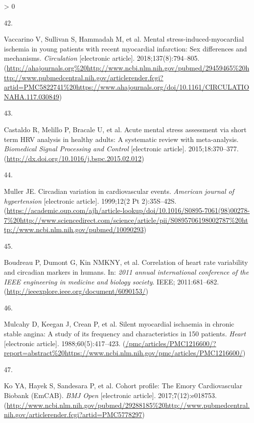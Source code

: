 \documentclass[
  11pt,
  openany]{book}
\newlength{\cslhangindent}
\newlength{\csllabelwidth}
\newenvironment{CSLReferences}[2] %
 {%
  \setlength{\parindent}{0pt}
  \ifodd #1 \everypar{\setlength{\hangindent}{\cslhangindent}}\ignorespaces\fi
  \ifnum #2 > 0
  \setlength{\parskip}{#2\baselineskip}
  \fi
 }%
 {}
\newcommand{\CSLLeftMargin}[1]{\parbox[t]{\csllabelwidth}{#1}}
\newcommand{\CSLRightInline}[1]{\parbox[t]{\linewidth - \csllabelwidth}{#1}\break}
\begin{document}
\begin{CSLReferences}{0}{0}
\leavevmode\hypertarget{ref-Vaccarino2018}{}%
\CSLLeftMargin{42. }
\CSLRightInline{Vaccarino V, Sullivan S, Hammadah M, et al. {Mental stress-induced-myocardial ischemia in young patients with recent myocardial infarction: Sex differences and mechanisms}. \emph{Circulation} {[}electronic article{]}. 2018;137(8):794--805. (\url{http://ahajournals.org\%20http://www.ncbi.nlm.nih.gov/pubmed/29459465\%20http://www.pubmedcentral.nih.gov/articlerender.fcgi?artid=PMC5822741\%20https://www.ahajournals.org/doi/10.1161/CIRCULATIONAHA.117.030849})}

\leavevmode\hypertarget{ref-Castaldo2015}{}%
\CSLLeftMargin{43. }
\CSLRightInline{Castaldo R, Melillo P, Bracale U, et al. {Acute mental stress assessment via short term HRV analysis in healthy adults: A systematic review with meta-analysis}. \emph{Biomedical Signal Processing and Control} {[}electronic article{]}. 2015;18:370--377. (\url{http://dx.doi.org/10.1016/j.bspc.2015.02.012})}

\leavevmode\hypertarget{ref-Muller1999}{}%
\CSLLeftMargin{44. }
\CSLRightInline{Muller JE. {Circadian variation in cardiovascular events.} \emph{American journal of hypertension} {[}electronic article{]}. 1999;12(2 Pt 2):35S--42S. (\url{https://academic.oup.com/ajh/article-lookup/doi/10.1016/S0895-7061(98)00278-7\%20http://www.sciencedirect.com/science/article/pii/S0895706198002787\%20http://www.ncbi.nlm.nih.gov/pubmed/10090293})}

\leavevmode\hypertarget{ref-Boudreau2011}{}%
\CSLLeftMargin{45. }
\CSLRightInline{Boudreau P, Dumont G, Kin NMKNY, et al. {Correlation of heart rate variability and circadian markers in humans}. In: \emph{2011 annual international conference of the IEEE engineering in medicine and biology society}. IEEE; 2011:681--682.(\url{http://ieeexplore.ieee.org/document/6090153/})}

\leavevmode\hypertarget{ref-Mulcahy1988}{}%
\CSLLeftMargin{46. }
\CSLRightInline{Mulcahy D, Keegan J, Crean P, et al. {Silent myocardial ischaemia in chronic stable angina: A study of its frequency and characteristics in 150 patients}. \emph{Heart} {[}electronic article{]}. 1988;60(5):417--423. (\url{/pmc/articles/PMC1216600/?report=abstract\%20https://www.ncbi.nlm.nih.gov/pmc/articles/PMC1216600/})}

\leavevmode\hypertarget{ref-Ko2017}{}%
\CSLLeftMargin{47. }
\CSLRightInline{Ko YA, Hayek S, Sandesara P, et al. {Cohort profile: The Emory Cardiovascular Biobank (EmCAB)}. \emph{BMJ Open} {[}electronic article{]}. 2017;7(12):e018753. (\url{http://www.ncbi.nlm.nih.gov/pubmed/29288185\%20http://www.pubmedcentral.nih.gov/articlerender.fcgi?artid=PMC5778297})}


\end{CSLReferences}
\end{document}
